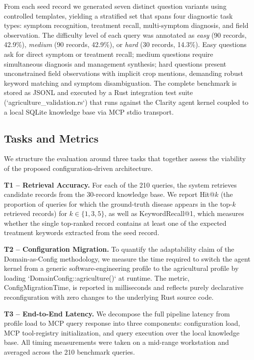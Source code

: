 \documentclass[11pt,a4paper]{article}
\begin{document}
From each seed record we generated seven distinct question variants using controlled templates, yielding a stratified set that spans four diagnostic task types: symptom recognition, treatment recall, multi-symptom diagnosis, and field observation. The difficulty level of each query was annotated as \textit{easy} (90 records, 42.9\%), \textit{medium} (90 records, 42.9\%), or \textit{hard} (30 records, 14.3\%). Easy questions ask for direct symptom or treatment recall; medium questions require simultaneous diagnosis and management synthesis; hard questions present unconstrained field observations with implicit crop mentions, demanding robust keyword matching and symptom disambiguation. The complete benchmark is stored as JSONL and executed by a Rust integration test suite (`agriculture_validation.rs`) that runs against the Clarity agent kernel coupled to a local SQLite knowledge base via MCP stdio transport.

\subsection{Tasks and Metrics}

We structure the evaluation around three tasks that together assess the viability of the proposed configuration-driven architecture.

\textbf{T1 -- Retrieval Accuracy.} For each of the 210 queries, the system retrieves candidate records from the 30-record knowledge base. We report Hit@$k$ (the proportion of queries for which the ground-truth disease appears in the top-$k$ retrieved records) for $k \in \{1, 3, 5\}$, as well as KeywordRecall@1, which measures whether the single top-ranked record contains at least one of the expected treatment keywords extracted from the seed record.

\textbf{T2 -- Configuration Migration.} To quantify the adaptability claim of the Domain-as-Config methodology, we measure the time required to switch the agent kernel from a generic software-engineering profile to the agricultural profile by loading `DomainConfig::agriculture()` at runtime. The metric, ConfigMigrationTime, is reported in milliseconds and reflects purely declarative reconfiguration with zero changes to the underlying Rust source code.

\textbf{T3 -- End-to-End Latency.} We decompose the full pipeline latency from profile load to MCP query response into three components: configuration load, MCP tool-registry initialization, and query execution over the local knowledge base. All timing measurements were taken on a mid-range workstation and averaged across the 210 benchmark queries.
\end{document}
